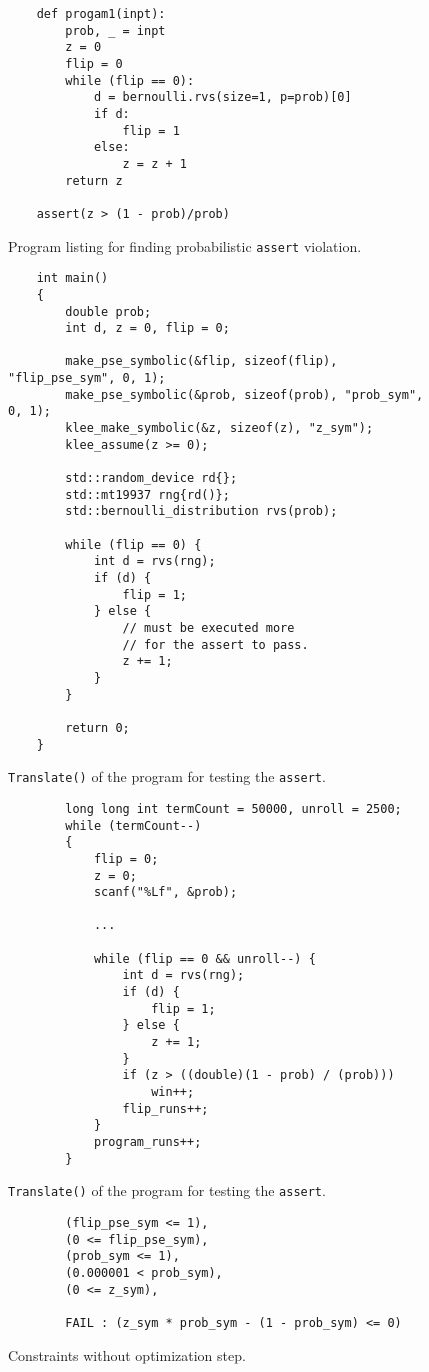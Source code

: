 \documentclass[usenames,dvipsnames,acmsmall]{acmart}
\begin{document}
	\begin{figure}
		\begin{verbatim}
	def progam1(inpt):
		prob, _ = inpt
		z = 0
		flip = 0
		while (flip == 0):
			d = bernoulli.rvs(size=1, p=prob)[0]
			if d:
				flip = 1
			else:
				z = z + 1
		return z
		
	assert(z > (1 - prob)/prob)
		\end{verbatim}
		\caption{Program listing for finding probabilistic \texttt{assert} violation.}
	\end{figure}
	\begin{figure}
		\begin{verbatim}
	int main()
	{
		double prob;
		int d, z = 0, flip = 0;
		
		make_pse_symbolic(&flip, sizeof(flip), "flip_pse_sym", 0, 1);
		make_pse_symbolic(&prob, sizeof(prob), "prob_sym", 0, 1);
		klee_make_symbolic(&z, sizeof(z), "z_sym");
		klee_assume(z >= 0);
		
		std::random_device rd{};
		std::mt19937 rng{rd()};
		std::bernoulli_distribution rvs(prob);
		
		while (flip == 0) {
			int d = rvs(rng);
			if (d) {
				flip = 1;
			} else {
				// must be executed more 
				// for the assert to pass. 
				z += 1; 
			}
		}
		
		return 0;
	}
		\end{verbatim}
		\caption{\texttt{Translate()} of the program for testing the \texttt{assert}. }
	\end{figure}
	\begin{figure}
		\begin{verbatim}
		long long int termCount = 50000, unroll = 2500;
		while (termCount--)
		{
			flip = 0;
			z = 0;
			scanf("%Lf", &prob);
			
			...
			
			while (flip == 0 && unroll--) {
				int d = rvs(rng);
				if (d) {
					flip = 1;
				} else { 
					z += 1; 
				}
				if (z > ((double)(1 - prob) / (prob)))
					win++;
				flip_runs++;
			}
			program_runs++;
		}
		\end{verbatim}
		\caption{\texttt{Translate()} of the program for testing the \texttt{assert}. }
	\end{figure}
	\begin{figure}
			\begin{verbatim}
		(flip_pse_sym <= 1),
		(0 <= flip_pse_sym),
		(prob_sym <= 1),
		(0.000001 < prob_sym),
		(0 <= z_sym),
		
		FAIL : (z_sym * prob_sym - (1 - prob_sym) <= 0)
		\end{verbatim}
		\caption{Constraints without optimization step.}
	\end{figure}
\end{document}
